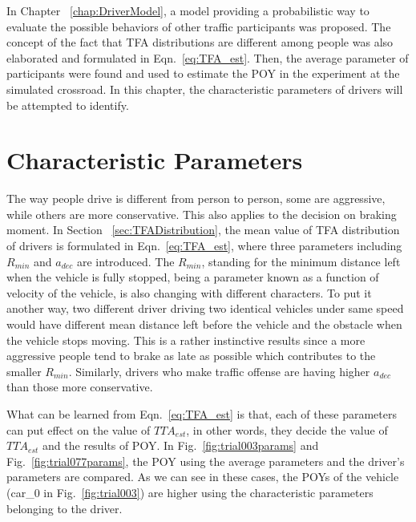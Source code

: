 

In Chapter ~\ref{chap:DriverModel}, a model providing a probabilistic way to evaluate the possible behaviors of other traffic participants was proposed. The concept of the fact that TFA distributions are different among people was also elaborated and formulated in Eqn.~\ref{eq:TFA_est}. Then, the average parameter of participants were found and used to estimate the POY in the experiment at the simulated crossroad. In this chapter, the characteristic parameters of drivers will be attempted to identify.


\section{Characteristic Parameters}
\label{sec:characterParam}

The way people drive is different from person to person, some are aggressive, while others are more conservative. This also applies to the decision on braking moment. In Section ~\ref{sec:TFADistribution}, the mean value of TFA distribution of drivers is formulated in Eqn.~\ref{eq:TFA_est}, where three parameters including $R_{min}$ and $a_{dec}$ are introduced. The $R_{min}$, standing for the minimum distance left when the vehicle is fully stopped, being a parameter known as a function of velocity of the vehicle, is also changing with different characters. To put it another way, two different driver driving two identical vehicles under same speed would have different mean distance left before the vehicle and the obstacle when the vehicle stops moving. This is a rather instinctive results since a more aggressive people tend to brake as late as possible which contributes to the smaller $R_{min}$. Similarly, drivers who make traffic offense are having higher $a_{dec}$ than those more conservative.

What can be learned from Eqn.~\ref{eq:TFA_est} is that, each of these parameters can put effect on the value of ${TTA}_{est}$, in other words, they decide the value of ${TTA}_{est}$ and the results of POY. In Fig.~\ref{fig:trial003params} and Fig.~\ref{fig:trial077params}, the POY using the average parameters and the driver's parameters are compared. As we can see in these cases, the POYs of the vehicle (car\_0 in Fig.~\ref{fig:trial003}) are higher using the characteristic parameters belonging to the driver. 



